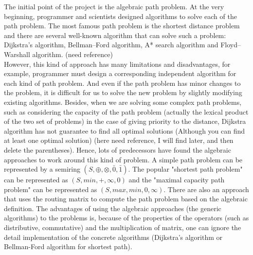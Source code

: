 \documentclass[a4paper,12pt,twoside,openright]{report}
\begin{document}
The initial point of the project is the algebraic path problem. 
At the very beginning, programmer and scientists designed algorithms to solve each of the path problem. The most famous path problem is the shortest distance problem and there are several well-known algorithm that can solve such a problem: Dijkstra's algorithm, Bellman–Ford algorithm, A* search algorithm and Floyd–Warshall algorithm. (need reference)\\
However, this kind of approach has many limitations and disadvantages, for example, programmer must design a corresponding independent algorithm for each kind of path problem. 
And even if the path problem has minor changes to the problem, it is difficult for us to solve the new problem by slightly modifying existing algorithms. 
Besides, when we are solving some complex path problems, such as considering the capacity of the path problem (actually the lexical product of the two set of problems) in the case of giving priority to the distance, Dijkstra algorithm has not guarantee to find all optimal solutions (Although you can find at least one optimal solution) (here need reference, I will find later, and then delete the parentheses).
Hence, lots of predecessors have found the algebraic approaches to work around this kind of problem. 
A simple path problem can be represented by a semiring $(S,\oplus,\otimes,\bar{0},\bar{1})$\cite{carre_algebra_1971,WONGSEELASHOTE197955,dynerowicz_forwarding_2013,mohri_semiring_2002,gurney_lexicographic_2007}. The popular "shortest path problem" can be represented as $(S, min,+,\infty,0)$\cite{mohri_semiring_2002} and the "maximal capacity path problem" can be represented as $(S, max,min, 0, \infty)$. 
There are also an approach that uses the routing matrix to compute the path problem based on the algebraic definition.
The advantages of using the algebraic approaches (the generic algorithms) to the problems is, because of the properties of the operators (such as distributive, commutative) and the multiplication of matrix, one can ignore the detail implementation of the concrete algorithms (Dijkstra's algorithm or Bellman-Ford algorithm for shortest path)\cite{dynerowicz_forwarding_2013}. \\
\end{document}
